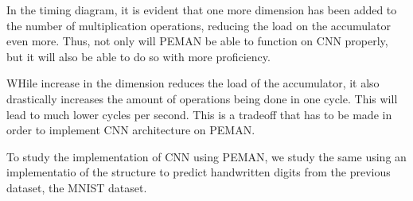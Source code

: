 In the timing diagram, it is evident that one more dimension has been added to the number of multiplication operations, reducing the load on the accumulator even more. Thus, not only will PEMAN be able to function on CNN properly, but it will also be able to do so with more proficiency.

WHile increase in the dimension reduces the load of the accumulator, it also drastically increases the amount of operations being done in one cycle. This will lead to much lower cycles per second. This is a tradeoff that has to be made in order to implement CNN architecture on PEMAN.

To study the implementation of CNN using PEMAN, we study the same using an implementatio of the structure to predict handwritten digits from the previous dataset, the MNIST dataset.

